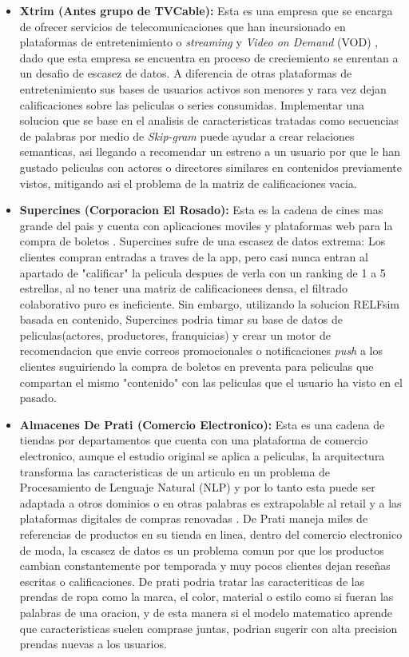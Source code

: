 \documentclass[12pt]{article}
\begin{document}
\begin{itemize}

	\item \textbf{Xtrim (Antes grupo de TVCable): } Esta es una empresa que se encarga de ofrecer servicios de telecomunicaciones que han incursionado en plataformas de  entretenimiento o \textit{streaming} y \textit{Video on Demand} (VOD) \cite{anziano2021xtrim}, dado que esta empresa se encuentra en proceso de creciemiento se enrentan a un desafio de escasez de datos. A diferencia de otras plataformas de entretenimiento sus bases de usuarios activos son menores y rara vez dejan calificaciones sobre las peliculas o series consumidas. Implementar una solucion que se base en el analisis de caracteristicas tratadas como secuencias de palabras por medio de \textit{Skip-gram} puede ayudar a crear relaciones semanticas, asi llegando a recomendar un estreno a un usuario por que le han gustado peliculas con actores o directores similares en contenidos previamente vistos, mitigando asi el problema de la matriz de calificaciones vacia.
	\item \textbf{Supercines (Corporacion El Rosado): } Esta es la cadena de cines mas grande del pais y cuenta con aplicaciones moviles y plataformas web para la compra de boletos \cite{appsupercines2026}. Supercines sufre de una escasez de datos extrema: Los clientes compran entradas a traves de la app, pero casi nunca entran al apartado de "calificar" la pelicula despues de verla con un ranking de 1 a 5 estrellas, al no tener una matriz de calificacionees densa, el filtrado colaborativo puro es ineficiente. Sin embargo, utilizando la solucion RELFsim basada en contenido, Supercines podria timar su base de datos de peliculas(actores, productores, franquicias) y crear un motor de recomendacion que envie correos promocionales o notificaciones \textit{push} a los clientes suguiriendo la compra de boletos en preventa para peliculas que compartan el mismo "contenido" con las peliculas que el usuario ha visto en el pasado.
	\item \textbf{Almacenes De Prati (Comercio Electronico): } Esta es una cadena de tiendas por departamentos que cuenta con una plataforma de comercio electronico, aunque el estudio original se aplica a peliculas, la arquitectura transforma las caracteristicas de un articulo en un problema de Procesamiento de Lenguaje Natural (NLP) y por lo tanto esta puede ser adaptada a otros dominios o en otras palabras es extrapolable al {retail} y a las plataformas digitales de compras renovadas \cite{itahora2019deprati}. De Prati maneja miles de referencias de productos en su tienda en linea, dentro del comercio electronico de moda, la escasez de datos es un problema comun por que los productos cambian constantemente por temporada y muy pocos clientes dejan reseñas escritas o calificaciones. De prati podria tratar las caracteriticas de las prendas de ropa como la marca, el color, material o estilo como si fueran las palabras de una oracion, y de esta manera si el modelo matematico aprende que caracteristicas suelen comprase juntas, podrian sugerir con alta precision prendas nuevas a los usuarios.
\end{itemize}
\end{document}
